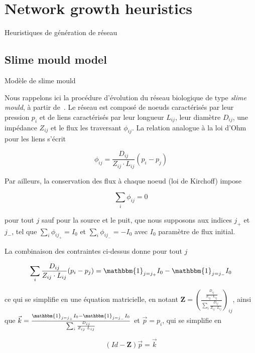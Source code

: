 




\newpage

\section{Network growth heuristics}{Heuristiques de génération de réseau}

\label{app:sec:networkgrowth}



\subsection{Slime mould model}{Modèle de slime mould}

Nous rappelons ici la procédure d'évolution du réseau biologique de type \emph{slime mould}, à partir de~\cite{tero2007mathematical}. Le réseau est composé de noeuds caractérisés par leur pression $p_i$ et de liens caractérisés par leur longueur $L_{ij}$, leur diamètre $D_{ij}$, une impédance $Z_{ij}$ et le flux les traversant $\phi_{ij}$. La relation analogue à la loi d'Ohm pour les liens s'écrit

\[
\phi_{ij} = \frac{D_{ij}}{Z_{ij}\cdot L_{ij}} \left(p_i - p_j\right)
\]

Par ailleurs, la conservation des flux à chaque noeud (loi de Kirchoff) impose

\[
\sum_i \phi_{ij} = 0
\]

pour tout $j$ sauf pour la source et le puit, que nous supposons aux indices $j_+$ et $j_-$, tel que $\sum_i \phi_{ij_+} = I_0$ et $\sum_i \phi_{ij_-} = -I_0$ avec $I_0$ paramètre de flux initial.

La combinaison des contraintes ci-dessus donne pour tout $j$

\[
\sum_i \frac{D_{ij}}{Z_{ij}\cdot L_{ij}} (p_i - p_j) = \mathbbm{1}_{j=j_+} I_0 - \mathbbm{1}_{j=j_-} I_0 
\]

ce qui se simplifie en une équation matricielle, en notant $\mathbf{Z} = \left(\frac{\frac{D_{ij}}{Z_{ij}\cdot L_{ij}}}{\sum_i \frac{D_{ij}}{Z_{ij}\cdot L_{ij}}}\right)_{ij}$, ainsi que $\vec{k} = \frac{\mathbbm{1}_{j=j_+} I_0 - \mathbbm{1}_{j=j_-} I_0 }{\sum_i \frac{D_{ij}}{Z_{ij}\cdot L_{ij}}}$ et $\vec{p} = p_i$, qui se simplifie en

\[
\left(Id - \mathbf{Z}\right) \vec{p} = \vec{k}
\]

